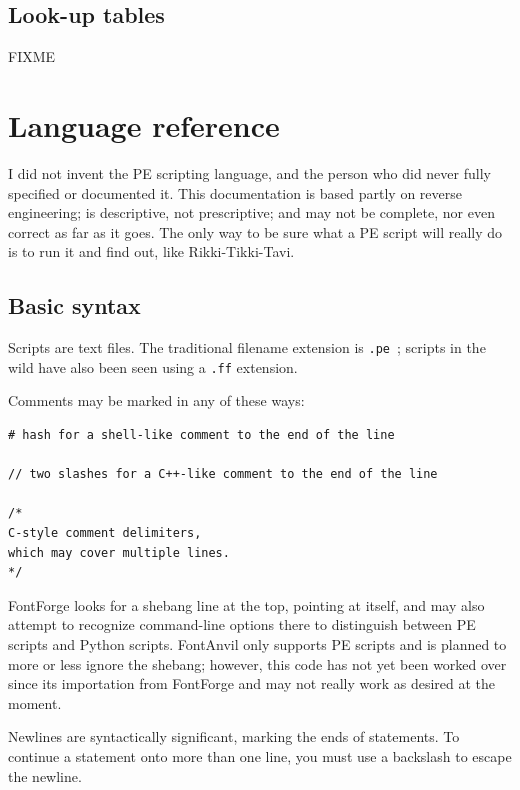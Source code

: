 \documentclass[11pt]{report}
\begin{document}
\section{Look-up tables}

FIXME

\clearpage


\chapter{Language reference}

\begin{framed}
I did not invent the PE scripting language, and the person who did never
fully specified or documented it.  This documentation is based partly on
reverse engineering; is descriptive, not prescriptive; and may not be
complete, nor even correct as far as it goes.  The only way to be sure
what a PE script will really do is to run it and find out, like
Rikki-Tikki-Tavi.
\end{framed}

\section{Basic syntax}

Scripts are text files.  The traditional filename extension is \texttt{.pe}~;
scripts in the wild have also been seen using a \texttt{.ff} extension.

Comments may be marked in any of these ways:
\begin{verbatim}
# hash for a shell-like comment to the end of the line

// two slashes for a C++-like comment to the end of the line

/*
C-style comment delimiters,
which may cover multiple lines.
*/
\end{verbatim}

FontForge looks for a shebang line at the top, pointing at itself, and may
also attempt to recognize command-line options there to distinguish between
PE scripts and Python scripts.  FontAnvil only supports PE scripts and is
planned to more or less ignore the shebang; however, this code has not yet
been worked over since its importation from FontForge and may not really
work as desired at the moment.

\begin{framed}
Newlines are syntactically significant, marking the ends of
statements.
To continue a statement onto more than one line, you must use a backslash to
escape the newline.  
\end{framed}
\end{document}
